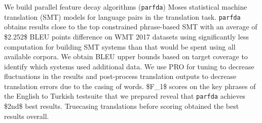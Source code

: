 We build parallel feature decay algorithms (\texttt{parfda}) Moses statistical machine translation (SMT) models for language pairs in the translation task. \texttt{parfda} obtains results close to the top constrained phrase-based SMT with an average of \$2.252\$ BLEU points difference on WMT 2017 datasets using significantly less computation for building SMT systems than that would be spent using all available corpora. We obtain BLEU upper bounds based on target coverage to identify which systems used additional data. We use PRO for tuning to decrease fluctuations in the results and post-process translation outputs to decrease translation errors due to the casing of words. \$F\_1\$ scores on the key phrases of the English to Turkish testsuite that we prepared reveal that \texttt{parfda} achieves \$2nd\$ best results. Truecasing translations before scoring obtained the best results overall.
